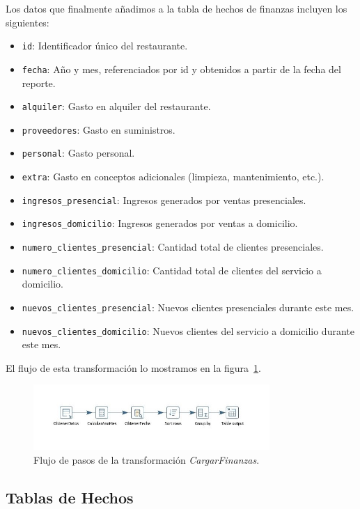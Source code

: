 \documentclass[11pt]{opticajnl}
\begin{document}
\noindent Los datos que finalmente añadimos a la tabla de hechos de finanzas incluyen los siguientes:

\begin{itemize}
    \item \texttt{id}: Identificador único del restaurante.
    \item \texttt{fecha}: Año y mes, referenciados por id y obtenidos a partir de la fecha del reporte.
    \item \texttt{alquiler}: Gasto en alquiler del restaurante.
    \item \texttt{proveedores}: Gasto en suministros.
    \item \texttt{personal}: Gasto personal.
    \item \texttt{extra}: Gasto en conceptos adicionales (limpieza, mantenimiento, etc.).
    \item \texttt{ingresos\_presencial}: Ingresos generados por ventas presenciales.
    \item \texttt{ingresos\_domicilio}: Ingresos generados por ventas a domicilio.
    \item \texttt{numero\_clientes\_presencial}: Cantidad total de clientes presenciales.
    \item \texttt{numero\_clientes\_domicilio}: Cantidad total de clientes del servicio a domicilio.
    \item \texttt{nuevos\_clientes\_presencial}: Nuevos clientes presenciales durante este mes.
    \item \texttt{nuevos\_clientes\_domicilio}: Nuevos clientes del servicio a domicilio durante este mes.
\end{itemize}

El flujo de esta transformación lo mostramos en la figura~\ref{fig:etl_finanzas}.

\begin{figure}[H]
    \centering
    \includegraphics[width=0.8\textwidth]{fotos/cargasfinanzas.jpg}
    \caption{Flujo de pasos de la transformación \textit{CargarFinanzas}.}
    \label{fig:etl_finanzas}
\end{figure}

\subsection{Tablas de Hechos}
\end{document}
